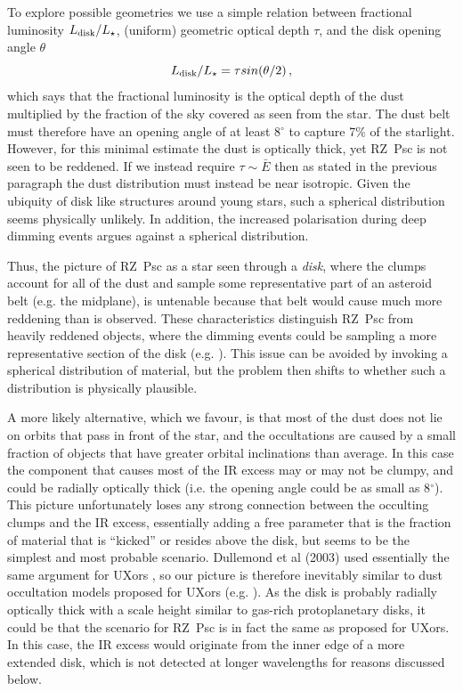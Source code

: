 \documentclass[]{rsos}
\begin{document}
To explore possible geometries we use a simple relation between fractional luminosity
$L_{\rm disk}/L_\star$, (uniform) geometric optical depth $\tau$, and the disk opening
angle $\theta$ \cite{2014MNRAS.438.3299K}
\begin{equation}
  L_{\rm disk}/L_\star = \tau sin(\theta/2) \, ,
\end{equation}
which says that the fractional luminosity is the optical depth of the dust multiplied by
the fraction of the sky covered as seen from the star. The dust belt must therefore have
an opening angle of at least 8$^\circ$ to capture 7\% of the starlight. However, for this
minimal estimate the dust is optically thick, yet RZ~Psc is not seen to be reddened. If
we instead require $\tau \sim \bar{E}$ then as stated in the previous paragraph the dust
distribution must instead be near isotropic. Given the ubiquity of disk like structures
around young stars, such a spherical distribution seems physically unlikely. In addition,
the increased polarisation during deep dimming events argues against a spherical
distribution.

Thus, the picture of RZ~Psc as a star seen through a \emph{disk}, where the clumps
account for all of the dust and sample some representative part of an asteroid belt
(e.g. the midplane), is untenable because that belt would cause much more reddening than
is observed. These characteristics distinguish RZ~Psc from heavily reddened objects,
where the dimming events could be sampling a more representative section of the disk
(e.g. \cite{2015MNRAS.451...26S}). This issue can be avoided by invoking a spherical
distribution of material, but the problem then shifts to whether such a distribution is
physically plausible.

A more likely alternative, which we favour, is that most of the dust does not lie on
orbits that pass in front of the star, and the occultations are caused by a small
fraction of objects that have greater orbital inclinations than average. In this case the
component that causes most of the IR excess may or may not be clumpy, and could be
radially optically thick (i.e. the opening angle could be as small as 8$^\circ$). This
picture unfortunately loses any strong connection between the occulting clumps and the IR
excess, essentially adding a free parameter that is the fraction of material that is
``kicked'' or resides above the disk, but seems to be the simplest and most probable
scenario. Dullemond et al (2003) used essentially the same argument for UXors
\cite{2003ApJ...594L..47D}, so our picture is therefore inevitably similar to dust
occultation models proposed for UXors
(e.g. \cite{1997ApJ...491..885N,2000A&A...364..633N,2003ApJ...594L..47D}).  As the disk
is probably radially optically thick with a scale height similar to gas-rich
protoplanetary disks, it could be that the scenario for RZ~Psc is in fact the same as
proposed for UXors. In this case, the IR excess would originate from the inner edge of a
more extended disk, which is not detected at longer wavelengths for reasons discussed
below.
\end{document}
